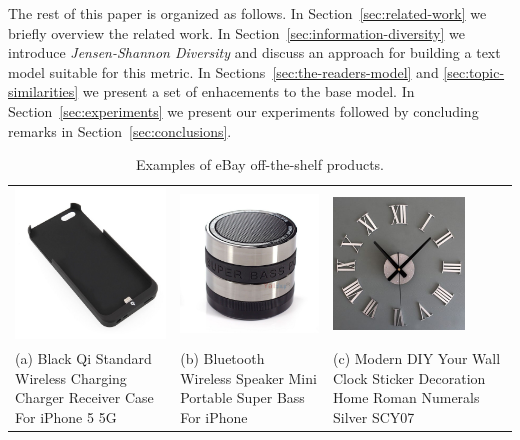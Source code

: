 The rest of this paper is organized as follows. In Section~\ref{sec:related-work} we briefly overview the related work. In Section~\ref{sec:information-diversity} we introduce {\em Jensen-Shannon Diversity} and discuss an approach for building a text model suitable for this metric. In Sections~\ref{sec:the-readers-model} and \ref{sec:topic-similarities} we present a set of enhacements to the base model. In Section~\ref{sec:experiments} we present our experiments followed by concluding remarks in Section~\ref{sec:conclusions}.

\begin{table}[t]
\caption{Examples of eBay off-the-shelf products.}
\label{tab:ebay-standard-products}
\begin{center}
\begin{tabular}{LLL}
\includegraphics[height=4.0cm]{figures/standard-iphone-case.jpg}&\includegraphics[height=4.0cm]{figures/standard-iphone-speaker.jpg}&\includegraphics[height=3.5cm]{figures/standard-clock.jpg}\\
(a) Black Qi Standard Wireless Charging Charger Receiver Case For iPhone 5 5G & (b) Bluetooth Wireless Speaker Mini Portable Super Bass For iPhone & (c) Modern DIY Your Wall Clock Sticker Decoration Home Roman Numerals Silver SCY07\\
\end{tabular}
\end{center}
\end{table}


